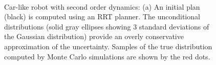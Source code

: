 \begin{figure}[!t]
{\,} \hfill
{}
\hfill
{}
\hfill
{}
{\,} \hfill
\vspace*{-5pt}
\caption{Car-like robot with second order dynamics: (a) An initial plan (black) is computed using an RRT planner. The unconditional distributions (solid gray ellipses showing $3$ standard deviations of the Gaussian distribution) provide an overly conservative approximation of the uncertainty. Samples of the true distribution computed by Monte Carlo simulations are shown by the red dots.
}
\end{figure}
